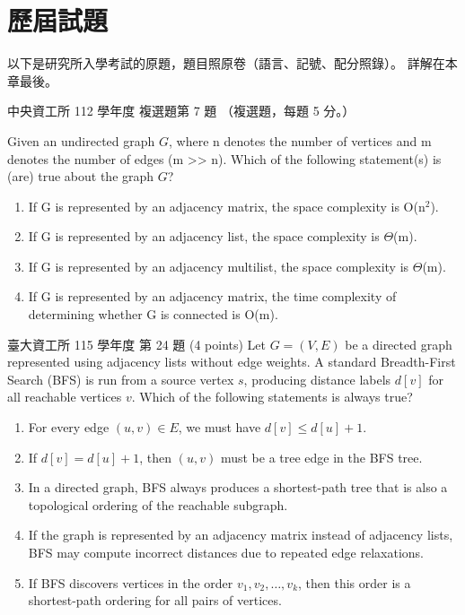 \section{歷屆試題}
\label{sec:gtr-pastexam}

以下是研究所入學考試的原題，題目照原卷（語言、記號、配分照錄）。 詳解在本章最後。

\begin{pastexam}[label={px:gtr-1}]{中央資工所 112 學年度 複選題第 7 題}
（複選題，每題 5 分。）

Given an undirected graph $G$, where n denotes the number of vertices and m denotes the number of edges (m >> n). Which of the following statement(s) is (are) true about the graph $G$?
\begin{enumerate}[label=(\Alph*)]
\item If G is represented by an adjacency matrix, the space complexity is O(n$^2$).
\item If G is represented by an adjacency list, the space complexity is $\Theta$(m).
\item If G is represented by an adjacency multilist, the space complexity is $\Theta$(m).
\item If G is represented by an adjacency matrix, the time complexity of determining whether G is connected is O(m).
\end{enumerate}
\end{pastexam}

\begin{pastexam}[label={px:gtr-2}]{臺大資工所 115 學年度 第 24 題}
(4 points) Let $G=(V,E)$ be a directed graph represented using adjacency lists without edge weights. A standard Breadth-First Search (BFS) is run from a source vertex $s$, producing distance labels $d[v]$ for all reachable vertices $v$. Which of the following statements is always true?
\begin{enumerate}[label=(\Alph*)]
\item For every edge $(u,v)\in E$, we must have $d[v]\le d[u]+1$.
\item If $d[v]=d[u]+1$, then $(u,v)$ must be a tree edge in the BFS tree.
\item In a directed graph, BFS always produces a shortest-path tree that is also a topological ordering of the reachable subgraph.
\item If the graph is represented by an adjacency matrix instead of adjacency lists, BFS may compute incorrect distances due to repeated edge relaxations.
\item If BFS discovers vertices in the order $v_1,v_2,\ldots,v_k$, then this order is a shortest-path ordering for all pairs of vertices.
\end{enumerate}
\end{pastexam}

